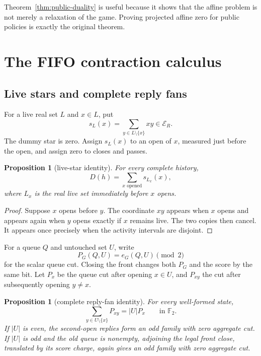 \documentclass[11pt]{article}
\newtheorem{proposition}[theorem]{Proposition}
\theoremstyle{definition}
\theoremstyle{remark}
\begin{document}
Theorem~\ref{thm:public-duality} is useful because it shows that the affine
problem is not merely a relaxation of the game.  Proving projected affine
zero for public policies is exactly the original theorem.

\section{The FIFO contraction calculus}\label{sec:calculus}

\subsection{Live stars and complete reply fans}

For a live real set $L$ and $x\in L$, put
\[
  s_L(x)=\sum_{y\in L\setminus\{x\}}xy\in\mathcal E_R.
\]
The dummy star is zero.  Assign $s_L(x)$ to an open of $x$, measured just
before the open, and assign zero to closes and passes.

\begin{proposition}[live-star identity]\label{prop:star}
For every complete history,
\[
  D(h)=\sum_{x\text{ opened}}s_{L_x}(x),
\]
where $L_x$ is the real live set immediately before $x$ opens.
\end{proposition}

\begin{proof}
Suppose $x$ opens before $y$.  The coordinate $xy$ appears when $x$ opens
and appears again when $y$ opens exactly if $x$ remains live.  The two copies
then cancel.  It appears once precisely when the activity intervals are
disjoint.
\end{proof}

For a queue $Q$ and untouched set $U$, write
\[
  P_G(Q,U)=e_G(Q,U)\pmod2
\]
for the scalar queue cut.  Closing the front changes both $P_G$ and the score
by the same bit.  Let $P_x$ be the queue cut after opening $x\in U$, and
$P_{xy}$ the cut after subsequently opening $y\ne x$.

\begin{proposition}[complete reply-fan identity]\label{prop:fan}
For every well-formed state,
\[
  \sum_{y\in U\setminus\{x\}}P_{xy}=|U|P_x
  \qquad\text{in }\mathbb F_2.
\]
If $|U|$ is even, the second-open replies form an odd family with zero
aggregate cut.  If $|U|$ is odd and the old queue is nonempty, adjoining the
legal front close, translated by its score charge, again gives an odd family
with zero aggregate cut.
\end{proposition}
\end{document}
